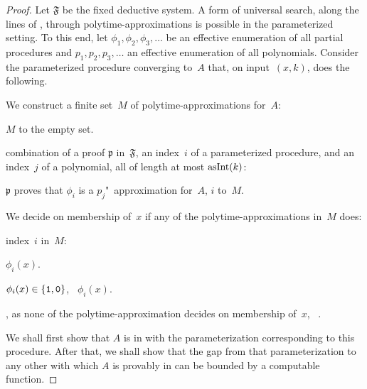 \begin{proof}
  Let $\mathfrak{F}$ be the fixed deductive system.
  A form of universal search, along the lines of \textcite{hutter2002fastest}, through polytime-approximations is possible in the parameterized setting.
  To this end, let $\phi_1, \phi_2, \phi_3, \ldots$ be an effective enumeration of all partial procedures and $p_1, p_2, p_3, \ldots$ an effective enumeration of all polynomials.
  Consider the parameterized procedure converging to~$A$ that, on input~$(x, k)$, does the following.
  \begin{codelisting}
  \item
    We construct a finite set~$M$ of polytime-approximations for~$A$:
    \begin{codelisting}
    \item
       $M$ to the empty set.
    \item
       combination of a proof $\mathfrak{p}$ in~$\mathfrak{F}$, an index~$i$ of a parameterized procedure, and an index~$j$ of a polynomial, all of length at most $\asNat(k)$:
      \begin{codelisting}
      \item\label{code:xpprincipal:approximations}%
         $\mathfrak{p}$ proves that $\phi_i$ is a $p_j$"~approximation for~$A$,
        \itemcont {} $i$ to~$M$.
      \end{codelisting}
    \end{codelisting}
  \item
    We decide on membership of~$x$ if any of the polytime-approximations in~$M$ does:
    \begin{codelisting}
    \item
       index~$i$ in~$M$:
      \begin{codelisting}
      \item
         $\phi_i(x)$.
      \item
         $\phi_i(x) \in \{\bits{1}, \bits{0}\}$, ~$\phi_i(x)$.
      \end{codelisting}
    \item
      , as none of the polytime-approximation decides on membership of~$x$, ~.
    \end{codelisting}
  \end{codelisting}

  We shall first show that $A$ is in  with the parameterization corresponding to this procedure.
  After that, we shall show that the gap from that parameterization to any other with which $A$ is provably in  can be bounded by a computable function.


\end{proof}
